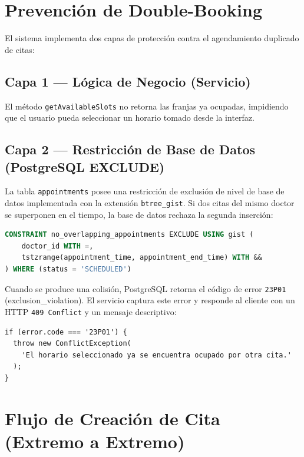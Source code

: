 \documentclass[a4paper,12pt]{article}
\begin{document}
    \section{Prevención de Double-Booking}

    El sistema implementa dos capas de protección contra el agendamiento duplicado de citas:

    \subsection{Capa 1 --- Lógica de Negocio (Servicio)}
    El método \texttt{getAvailableSlots} no retorna las franjas ya ocupadas, impidiendo que el usuario pueda seleccionar un horario tomado desde la interfaz.

    \subsection{Capa 2 --- Restricción de Base de Datos (PostgreSQL EXCLUDE)}
    La tabla \texttt{appointments} posee una restricción de exclusión de nivel de base de datos implementada con la extensión \texttt{btree\_gist}. Si dos citas del mismo doctor se superponen en el tiempo, la base de datos rechaza la segunda inserción:

    \begin{lstlisting}[language=SQL, caption={Restricción EXCLUDE en el esquema de la base de datos}]
CONSTRAINT no_overlapping_appointments EXCLUDE USING gist (
    doctor_id WITH =,
    tstzrange(appointment_time, appointment_end_time) WITH &&
) WHERE (status = 'SCHEDULED')
    \end{lstlisting}

    Cuando se produce una colisión, PostgreSQL retorna el código de error \texttt{23P01} (exclusion\_violation). El servicio captura este error y responde al cliente con un HTTP \texttt{409 Conflict} y un mensaje descriptivo:

    \begin{lstlisting}[caption={Manejo del 409 en \texttt{appointments.service.ts}}]
if (error.code === '23P01') {
  throw new ConflictException(
    'El horario seleccionado ya se encuentra ocupado por otra cita.'
  );
}
    \end{lstlisting}

    \section{Flujo de Creación de Cita (Extremo a Extremo)}
\end{document}

